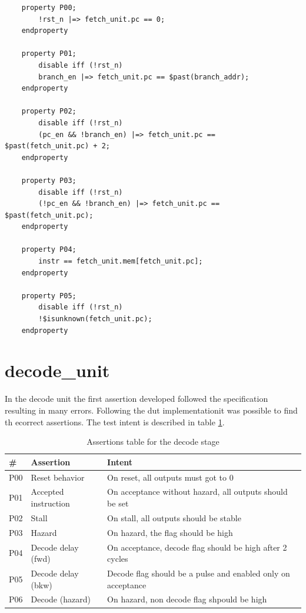 \newpage
\begin{verbatim}
	property P00;
		!rst_n |=> fetch_unit.pc == 0;
	endproperty

	property P01;
		disable iff (!rst_n)
		branch_en |=> fetch_unit.pc == $past(branch_addr);
	endproperty

	property P02;
		disable iff (!rst_n)
		(pc_en && !branch_en) |=> fetch_unit.pc == $past(fetch_unit.pc) + 2;
	endproperty

	property P03;
		disable iff (!rst_n)
		(!pc_en && !branch_en) |=> fetch_unit.pc == $past(fetch_unit.pc);
	endproperty

	property P04;
		instr == fetch_unit.mem[fetch_unit.pc];
	endproperty

	property P05;
		disable iff (!rst_n)
		!$isunknown(fetch_unit.pc);
	endproperty
\end{verbatim}

\section{decode\_unit}

In the decode unit the first assertion developed followed the specification resulting in many errors. 
Following the dut implementationit was possible to find th ecorrect assertions.
The test intent is described in table \ref{tab:assertions_decode}.

\begin{table}[h]
	\centering
	\begin{tabular}{|l|l|l|}
		\hline
		\textbf{\#} & \textbf{Assertion} 		& \textbf{Intent} \\ \hline
		P00 		& Reset behavior 	 		& On reset, all outputs must got to 0 \\ \hline
		P01			& Accepted instruction		& On acceptance without hazard, all outputs should be set \\ \hline
		P02         & Stall						& On stall, all outputs should be stable \\ \hline
		P03			& Hazard					& On hazard, the flag should be high \\ \hline
		P04			& Decode delay (fwd)		& On acceptance, decode flag should be high after 2 cycles \\ \hline
		P05 		& Decode delay (bkw)		& Decode flag should be a pulse and enabled only on acceptance \\ \hline
		P06			& Decode (hazard)			& On hazard, non decode flag shpould be high \\ \hline
	\end{tabular}
	\caption{Assertions table for the decode stage}
	\label{tab:assertions_decode}
\end{table}


